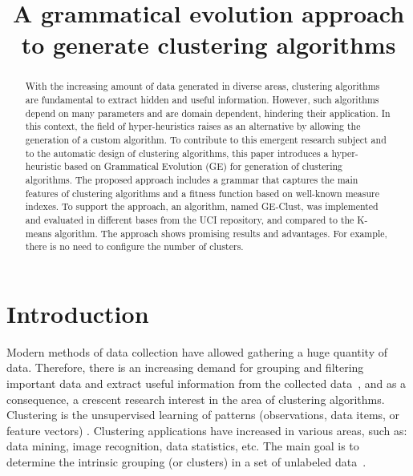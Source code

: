 \documentclass[conference]{IEEEtran}
\begin{document}
	
	\title{A grammatical evolution approach to generate clustering algorithms}
	
	
	\author{
		
		
		
	}
	
	\maketitle
	
	\begin{abstract} 
		
		With the increasing amount of data generated in diverse areas, clustering algorithms are fundamental to extract hidden and useful information. However, such algorithms depend on many parameters and are domain dependent, hindering their application. In this context, the field of hyper-heuristics raises as an alternative by allowing the generation of a custom algorithm. To contribute to this emergent research subject and to the automatic design of clustering algorithms, this paper introduces a hyper-heuristic based on Grammatical Evolution (GE) for generation of clustering algorithms. The proposed approach includes a grammar that captures the main features of clustering algorithms and a fitness function based on well-known measure indexes. To support the approach, an algorithm, named GE-Clust, was implemented and evaluated in different bases from the UCI repository, and compared to the K-means algorithm. The approach  shows promising results  and advantages. For example, there is no need to configure the number of clusters.
	\end{abstract}
	
	
	\IEEEpeerreviewmaketitle
	
	
	\section{Introduction}
	
	
	Modern methods of data collection have allowed gathering a huge quantity of data. Therefore, there is an increasing demand for grouping and filtering important data and extract useful information from the collected data~\cite{ahalya2015data}, and as a consequence, a crescent research interest in the area of clustering algorithms. Clustering is the unsupervised learning of patterns (observations, data items, or feature vectors) \cite{jain1988algorithms}. Clustering applications have increased in various areas, such as: data mining, image recognition, data statistics, etc. The main goal is to determine the intrinsic grouping (or clusters) in a set of unlabeled data~\cite{ahalya2015data}.
	
\end{document}
